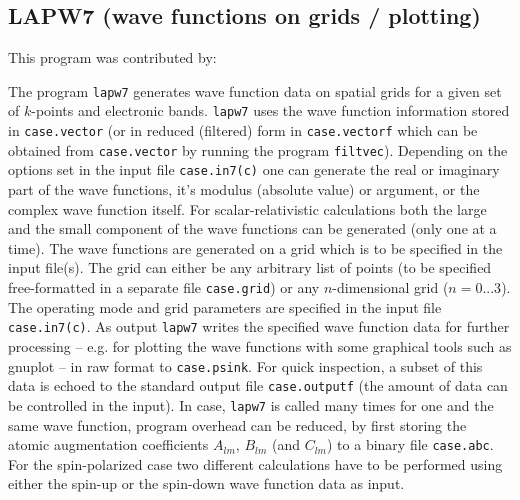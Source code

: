 \documentclass[10pt,fleqn,a4paper,twosided]{article}
\begin{document}


\subsection{LAPW7 (wave functions on grids / plotting)}
\vspace*{.5cm}

This program was contributed by:

\vspace*{.5cm}
\hspace*{1.5cm}
\vspace*{.75cm}

The program {\tt lapw7} generates wave function data on spatial grids
for a given set of $k$-points and electronic bands. 
{\tt lapw7} uses the wave function information stored in {\tt case.vector} 
(or in reduced (filtered) form in {\tt case.vectorf} which can be obtained
from {\tt case.vector} by running the program {\tt filtvec}).
Depending on the options set in the input file {\tt case.in7(c)} one can
generate the real or imaginary part of the wave functions, it's modulus
(absolute value) or argument, or the complex wave function itself. 
For scalar-relativistic calculations both the large and the small 
component of the wave functions can be generated (only one at a time).
The wave functions are generated on a grid which is to be specified in
the input file(s). The grid can either be any arbitrary list of points
(to be specified free-formatted in a separate file {\tt case.grid}) 
or any $n$-dimensional grid ($n=0...3$). The operating mode and 
grid parameters are specified in the input file {\tt case.in7(c)}.
As output {\tt lapw7} writes the specified wave function data for further
processing -- e.g. for plotting the wave functions with some graphical tools
such as gnuplot -- in raw format to {\tt case.psink}. For quick inspection,
a subset of this data is echoed to the standard output file
{\tt case.outputf} (the amount of data can be controlled in the input).
In case, {\tt lapw7} is called many times for one and the same wave function,
program overhead can be reduced, by first storing the atomic augmentation
coefficients $A_{lm}$, $B_{lm}$ (and $C_{lm}$) to a binary file {\tt case.abc}.
For the spin-polarized case two different calculations have to be performed
using either the spin-up or the spin-down wave function data as input.
 
\end{document}
